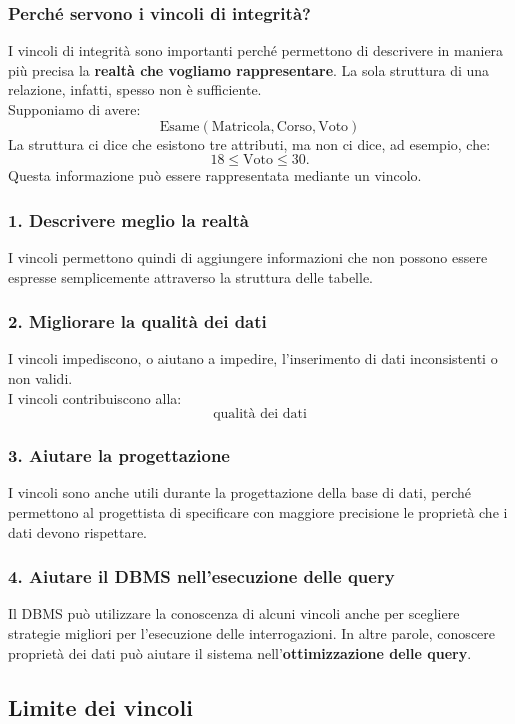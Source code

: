 \subsubsection{Perché servono i vincoli di integrità?}
I vincoli di integrità sono importanti perché permettono di descrivere
in maniera più precisa la \textbf{realtà che vogliamo rappresentare}.
La sola struttura di una relazione, infatti, spesso non è sufficiente.\\
Supponiamo di avere:
\[
\text{Esame}(\text{Matricola},\text{Corso},\text{Voto})
\]
La struttura ci dice che esistono tre attributi, ma non ci dice,
ad esempio, che:
\[
18 \leq \text{Voto} \leq 30.
\]
Questa informazione può essere rappresentata mediante un vincolo.
\subsubsection{1. Descrivere meglio la realtà}
I vincoli permettono quindi di aggiungere informazioni che non possono
essere espresse semplicemente attraverso la struttura delle tabelle.
\subsubsection{2. Migliorare la qualità dei dati}
I vincoli impediscono, o aiutano a impedire, l'inserimento di dati
inconsistenti o non validi.\\
I vincoli contribuiscono alla:
\[
\boxed{\text{qualità dei dati}}
\]
\subsubsection{3. Aiutare la progettazione}
I vincoli sono anche utili durante la progettazione della base di dati,
perché permettono al progettista di specificare con maggiore precisione
le proprietà che i dati devono rispettare.

\subsubsection{4. Aiutare il DBMS nell'esecuzione delle query}
Il DBMS può utilizzare la conoscenza di alcuni vincoli anche per
scegliere strategie migliori per l'esecuzione delle interrogazioni.
In altre parole, conoscere proprietà dei dati può aiutare il sistema
nell'\textbf{ottimizzazione delle query}.

\subsection*{Limite dei vincoli}

